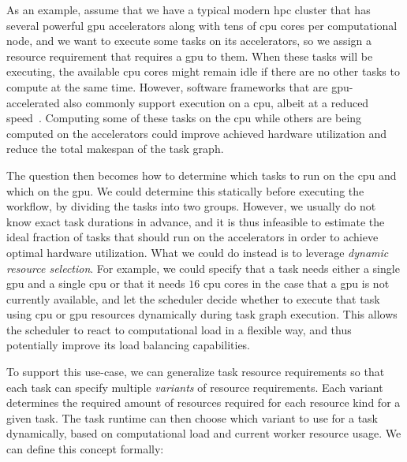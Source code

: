 As an example, assume that we have a typical modern \gls{hpc} cluster that has
several powerful \gls{gpu} accelerators along with tens of \gls{cpu}
cores per computational node, and we want to execute some tasks on its accelerators, so we assign a
resource requirement that requires a \gls{gpu} to them. When these tasks will be
executing, the available \gls{cpu} cores might remain idle if there are no other
tasks to compute at the same time. However, software frameworks that are
\gls{gpu}-accelerated also commonly support execution on a \gls{cpu},
albeit at a reduced speed~\cite{gromacs,tensorflow}. Computing some of these tasks on the
\gls{cpu} while others are being computed on the accelerators could improve achieved
hardware utilization and reduce the total makespan of the task graph.

The question then becomes how to determine which tasks to run on the \gls{cpu} and
which on the \gls{gpu}. We could determine this statically before executing the
workflow, by dividing the tasks into two groups. However, we usually do not know exact task
durations in advance, and it is thus infeasible to estimate the ideal fraction of tasks that should
run on the accelerators in order to achieve optimal hardware utilization. What we could do instead
is to leverage \emph{dynamic resource selection}. For example, we could specify that a task needs either a
single \gls{gpu} and a single \gls{cpu} or that it needs
$16$ \gls{cpu} cores in the case that a \gls{gpu} is
not currently available, and let the scheduler decide whether to execute that task using
\gls{cpu} or \gls{gpu} resources dynamically during task graph
execution. This allows the scheduler to react to computational load in a flexible way, and thus
potentially improve its load balancing capabilities.

To support this use-case, we can generalize task resource requirements so that each task can
specify multiple \emph{variants} of resource requirements. Each variant determines the
required amount of resources required for each resource kind for a given task. The task runtime can
then choose which variant to use for a task dynamically, based on computational load and current
worker resource usage. We can define this concept formally:

